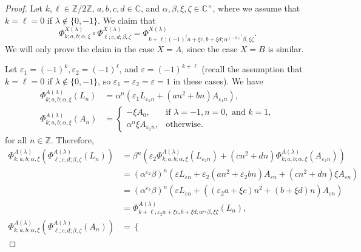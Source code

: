 \documentclass[11pt, svgnames]{amsart}
\newcommand{\ZZ}{\mathbb{Z}}
\newcommand{\CC}{\mathbb{C}}
\theoremstyle{definition}
\begin{document}
\begin{proof}
    Let $k,\ell \in \ZZ/2\ZZ$, $a,b,c,d \in \CC$, and $\alpha,\beta,\xi,\zeta \in \CC^\times$, where we assume that $k = \ell = 0$ if $\lambda \notin \{0,-1\}$. We claim that
    \begin{equation}\label{eq:automorphism composition}
        \Phi_{k;a,b;\alpha,\xi}^{X(\lambda)} \circ \Phi_{\ell;c,d;\beta,\zeta}^{X(\lambda)} = \Phi_{k + \ell; (-1)^\ell a + \xi c, b + \xi d; \alpha^{(-1)^\ell}\beta, \xi \zeta}^{X(\lambda)}.
    \end{equation}
    We will only prove the claim in the case $X = A$, since the case $X = B$ is similar.
    
    Let $\varepsilon_1 = (-1)^k, \varepsilon_2 = (-1)^\ell$, and $\varepsilon = (-1)^{k+\ell}$ (recall the assumption that $k = \ell = 0$ if $\lambda \notin \{0,-1\}$, so $\varepsilon_1 = \varepsilon_2 = \varepsilon = 1$ in these cases). We have
    \begin{align*}
        \Phi_{k;a,b;\alpha,\xi}^{A(\lambda)}(L_n) &= \alpha^n(\varepsilon_1 L_{\varepsilon_1 n} + (an^2 + bn)A_{\varepsilon_1 n}), \\
        \Phi_{k;a,b;\alpha,\xi}^{A(\lambda)}(A_n) &= \begin{cases}
            -\xi A_0, &\text{if } \lambda = -1, n = 0, \text{ and } k = 1, \\
            \alpha^n \xi A_{\varepsilon_1 n}, &\text{otherwise}.
        \end{cases}
    \end{align*}
    for all $n \in \ZZ$. Therefore,
    \begin{align*}
        \Phi_{k;a,b;\alpha,\xi}^{A(\lambda)}(\Phi_{\ell;c,d;\beta,\zeta}^{A(\lambda)}(L_n)) &= \beta^n\left(\varepsilon_2\Phi_{k;a,b;\alpha,\xi}^{A(\lambda)}(L_{\varepsilon_2 n}) + (cn^2 + dn)\Phi_{k;a,b;\alpha,\xi}^{A(\lambda)}(A_{\varepsilon_2 n})\right) \\
        &= (\alpha^{\varepsilon_2}\beta)^n\left(\varepsilon L_{\varepsilon n} + \varepsilon_2(an^2 + \varepsilon_2 b n)A_{\varepsilon n} + (cn^2 + dn)\xi A_{\varepsilon n}\right) \\
        &= (\alpha^{\varepsilon_2}\beta)^n\left(\varepsilon L_{\varepsilon n} + ((\varepsilon_2a + \xi c)n^2 + (b + \xi d)n)A_{\varepsilon n}\right) \\
        &= \Phi_{k+\ell; \varepsilon_2 a + \xi c, b + \xi d; \alpha^{\varepsilon_2} \beta, \xi \zeta}^{A(\lambda)}(L_n), \\
        \Phi_{k;a,b;\alpha,\xi}^{A(\lambda)}(\Phi_{\ell;c,d;\beta,\zeta}^{A(\lambda)}(A_n)) &= \begin{cases}

\end{cases}
\end{align*}
\end{proof}
\end{document}
